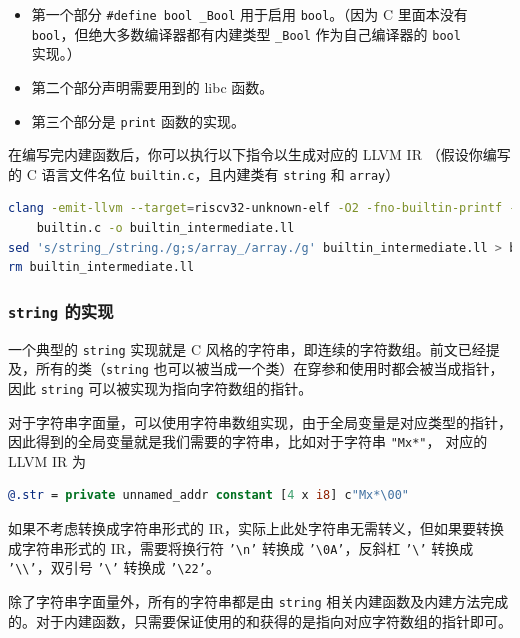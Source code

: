 \begin{itemize}
  \item 第一个部分 \texttt{\#define bool \_Bool} 用于启用 \texttt{bool}。（因为 C 里面本没有
    \texttt{bool}，但绝大多数编译器都有内建类型 \texttt{\_Bool} 作为自己编译器的 \texttt{bool}
    实现。）
  \item 第二个部分声明需要用到的 libc 函数。
  \item 第三个部分是 \texttt{print} 函数的实现。
\end{itemize}

在编写完内建函数后，你可以执行以下指令以生成对应的 LLVM IR
（假设你编写的 C 语言文件名位 \texttt{builtin.c}，且内建类有
\texttt{string} 和 \texttt{array}）
\begin{lstlisting}[language=sh]
clang -emit-llvm --target=riscv32-unknown-elf -O2 -fno-builtin-printf -fno-builtin-memcpy \
    builtin.c -o builtin_intermediate.ll
sed 's/string_/string./g;s/array_/array./g' builtin_intermediate.ll > builtin.ll
rm builtin_intermediate.ll
\end{lstlisting}

\subsubsection{\texttt{string} 的实现}\label{AST-to-IR-for-builtin-string}

一个典型的 \texttt{string} 实现就是 C 风格的字符串，即连续的字符数组。前文已经提及，所有的类（\texttt{string}
也可以被当成一个类）在穿参和使用时都会被当成指针，因此 \texttt{string}
可以被实现为指向字符数组的指针。

对于字符串字面量，可以使用字符串数组实现，由于全局变量是对应类型的指针，
因此得到的全局变量就是我们需要的字符串，比如对于字符串 \texttt{"Mx*"}，
对应的 LLVM IR 为
\begin{lstlisting}[language=llvm]
@.str = private unnamed_addr constant [4 x i8] c"Mx*\00"
\end{lstlisting}

如果不考虑转换成字符串形式的 IR，实际上此处字符串无需转义，但如果要转换成字符串形式的
IR，需要将换行符 \texttt{'\textbackslash{}n'} 转换成 \texttt{'\textbackslash{}0A'}，反斜杠
\texttt{'\textbackslash'} 转换成 \texttt{'\textbackslash\textbackslash'}，双引号
\texttt{'\textbackslash'} 转换成 \texttt{'\textbackslash22'}。

除了字符串字面量外，所有的字符串都是由 \texttt{string}
相关内建函数及内建方法完成的。对于内建函数，只需要保证使用的和获得的是指向对应字符数组的指针即可。

